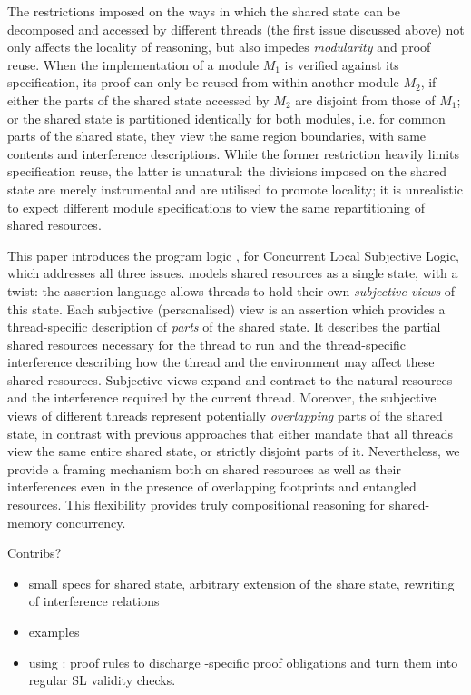 The restrictions imposed on the ways in which the shared state can be decomposed and accessed by different threads (the first issue discussed above) not only affects the locality of reasoning, but also impedes \emph{modularity} and proof reuse. When the implementation of a module $M_1$ is verified against its specification, its proof can only be reused from within another module $M_2$, if either the parts of the shared state accessed by $M_2$ are disjoint from those of $M_1$; or the shared state is partitioned identically for both modules, i.e. for common parts of the shared state, they view the same region boundaries, with same contents and interference descriptions. While the former restriction heavily limits specification reuse, the latter is unnatural: the divisions imposed on the shared state are merely instrumental and are utilised to promote locality; it is unrealistic to expect different module specifications to view the same repartitioning of shared resources. 

This paper introduces the program logic \colosl, for Concurrent Local
Subjective Logic, which addresses all three issues. \colosl models
shared resources as a single state, with a twist: the assertion
language allows threads to hold their own \emph{subjective views} of
this state. Each subjective (personalised) view is an assertion which
provides a thread-specific description of \emph{parts} of the shared
state. It describes the partial shared resources necessary for the
thread to run and the thread-specific interference describing how the
thread and the environment may affect these shared
resources. Subjective views expand and contract to the natural
resources and the interference required by the current
thread. Moreover, the subjective views of different threads represent
potentially \emph{overlapping} parts of the shared state, in contrast
with previous approaches that either mandate that all threads view the
same entire shared state, or strictly disjoint parts of
it. Nevertheless, we provide a framing mechanism both on shared
resources as well as their interferences even in the presence of
overlapping footprints and entangled resources. This flexibility
provides truly compositional reasoning for shared-memory concurrency.

Contribs?
\begin{itemize}
\item
  small specs for shared state,
  arbitrary extension of the share state,
  rewriting of interference relations
\item
  examples
\item
  using \colosl: proof rules to discharge \colosl-specific proof
  obligations and turn them into regular SL validity checks.
\end{itemize}


